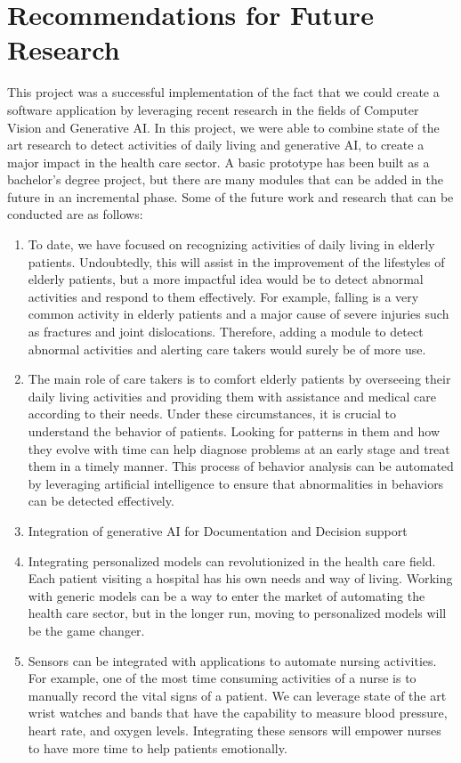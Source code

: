 \section{Recommendations for Future Research}
This project was a successful implementation of the fact that we could create a software application by leveraging  recent research  in the fields of Computer Vision and Generative AI. In this project, we were able to combine state of the art research to detect activities of daily living and generative AI, to create a major impact in the health care sector. A basic prototype has been built as a bachelor's degree project, but there are many modules that can be added in the future in an incremental phase. Some of the future work and research that can be conducted are as follows:

\begin{enumerate}
    \item To date, we have focused on recognizing activities of daily living in elderly patients. Undoubtedly, this will assist in the improvement of the lifestyles of elderly patients, but a more impactful idea would be to detect abnormal activities and respond to them effectively. For example, falling is a very common activity in elderly patients and a major cause of severe injuries such as fractures and joint dislocations. Therefore, adding a module to detect abnormal activities and alerting  care takers would surely be of more use.
    \item The main role of  care takers is to comfort  elderly patients by overseeing their daily living activities and providing them with assistance and medical care according to their needs. Under these circumstances, it is crucial to understand the behavior of  patients. Looking for patterns in them and how they evolve with time can help diagnose problems at an early stage and treat them in a timely manner. This process of behavior analysis can be automated by leveraging artificial intelligence to ensure that abnormalities in behaviors can be detected effectively.
    \item Integration of generative AI for Documentation and Decision support
    \item Integrating personalized models can revolutionized in the health care field. Each patient visiting a hospital has his own needs and way of living. Working with generic models can be a way to enter the market of automating the health care sector, but in the longer run, moving to personalized models will be the game changer.
    \item Sensors can be integrated with  applications to automate  nursing activities. For example, one of the most time consuming activities of a nurse is to manually record the vital signs of a patient. We can leverage state of the art wrist watches and bands that have the capability to measure  blood pressure, heart rate, and oxygen levels. Integrating these sensors will empower  nurses to have more time to help patients emotionally.

\end{enumerate}
